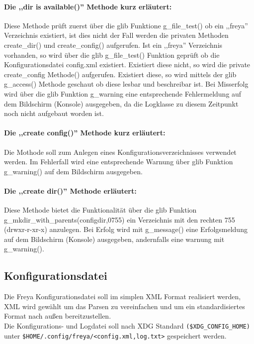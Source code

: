 \paragraph{Die ,,dir is available()'' Methode kurz erläutert:}
Diese Methode prüft zuerst über die glib Funktione g\_file\_test() ob ein ,,freya'' Verzeichnis existiert,
ist dies nicht der Fall werden die privaten Methoden create\_dir() und create\_config() aufgerufen.
Ist ein ,,freya'' Verzeichnis vorhanden, so wird über die glib g\_file\_test() Funktion geprüft ob die Konfigurationsdatei
config.xml existiert. Existiert diese nicht, so wird die private create\_config Methode() aufgerufen.
Existiert diese, so wird mittels der glib g\_access() Methode geschaut ob diese lesbar und beschreibar ist. 
Bei Misserfolg wird über die glib Funktion g\_warning eine entsprechende Fehlermeldung auf
dem Bildschirm (Konsole) ausgegeben, da die Logklasse zu diesem Zeitpunkt noch nicht aufgebaut worden ist.


\paragraph{Die ,,create config()'' Methode kurz erläutert:}
Die Mothode soll zum Anlegen eines Konfigurationsverzeichnisses verwendet werden.
Im Fehlerfall wird eine entsprechende Warnung über glib Funktion g\_warning() auf dem Bildschirm ausgegeben.

\paragraph{Die ,,create dir()'' Methode erläutert:}
Diese Methode bietet die Funktionalität über die glib Funktion g\_mkdir\_with\_parents(configdir,0755) ein Verzeichnis mit den rechten 755 (drwxr-r-xr-x) anzulegen. Bei Erfolg wird mit g\_message() eine Erfolgsmeldung auf dem Bildschirm (Konsole)
ausgegeben, andernfalls eine warnung mit g\_warning().



\subsection{Konfigurationsdatei}

Die Freya Konfigurationsdatei soll im simplen XML Format realisiert werden, XML wird gewählt um das Parsen zu vereinfachen und um
ein standardisiertes Format nach außen bereitzustellen. 
\\
Die Konfigurations- und Logdatei soll nach XDG Standard \verb+($XDG_CONFIG_HOME)+ unter \verb+$HOME/.config/freya/<config.xml,log.txt>+ gespeichert werden.

